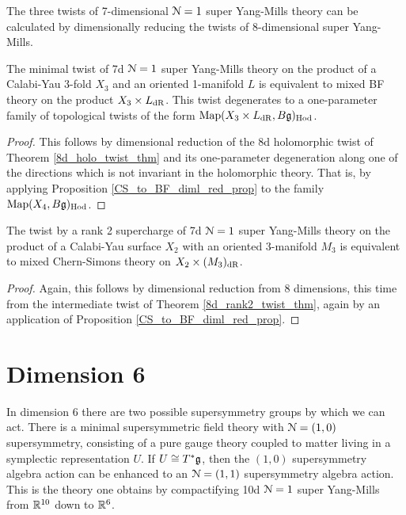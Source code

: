 \documentclass[10pt, oneside]{article}
\begin{document}
The three twists of 7-dimensional $\mathcal{N}=1$ super Yang-Mills theory can be calculated by dimensionally reducing the twists of 8-dimensional super Yang-Mills.

\begin{theorem} \label{7d_holo_twist_thm}
The minimal twist of 7d $\mathcal{N}=1$ super Yang-Mills theory on the product of a Calabi-Yau 3-fold $X_3$ and an oriented 1-manifold $L$ is equivalent to mixed BF theory on the product $X_3 \times L_{\mathrm{dR}}$. This twist degenerates to a one-parameter family of topological twists of the form $\operatorname{Map}(X_3 \times L_{\mathrm{dR}}, B\mathfrak{g})_{\mathrm{Hod}}$.
\end{theorem}

\begin{proof}
This follows by dimensional reduction of the 8d holomorphic twist of Theorem \ref{8d_holo_twist_thm} and its one-parameter degeneration along one of the directions which is not invariant in the holomorphic theory.  That is, by applying Proposition \ref{CS_to_BF_diml_red_prop} to the family $\operatorname{Map}(X_4, B\mathfrak{g})_{\mathrm{Hod}}$.
\end{proof}

\begin{theorem} \label{7d_rank2_twist_thm}
The twist by a rank 2 supercharge of 7d $\mathcal{N}=1$ super Yang-Mills theory on the product of a Calabi-Yau surface $X_2$ with an oriented 3-manifold $M_3$ is equivalent to mixed Chern-Simons theory on $X_2 \times (M_3)_{\mathrm{dR}}$. 
\end{theorem}

\begin{proof}
Again, this follows by dimensional reduction from 8 dimensions, this time from the intermediate twist of Theorem \ref{8d_rank2_twist_thm}, again by an application of Proposition \ref{CS_to_BF_diml_red_prop}.
\end{proof}

\section{Dimension 6}
In dimension 6 there are two possible supersymmetry groups by which we can act.  
There is a minimal supersymmetric field theory with $\mathcal{N}=(1,0)$ supersymmetry, consisting of a pure gauge theory coupled to matter living in a symplectic representation $U$.  
If $U \cong T^*\mathfrak{g}$, then the $(1,0)$ supersymmetry algebra action can be enhanced to an $\mathcal{N}=(1,1)$ supersymmetry algebra action.  
This is the theory one obtains by compactifying 10d $\mathcal{N}=1$ super Yang-Mills from $\mathbb R^{10}$ down to $\mathbb R^6$.
\end{document}
